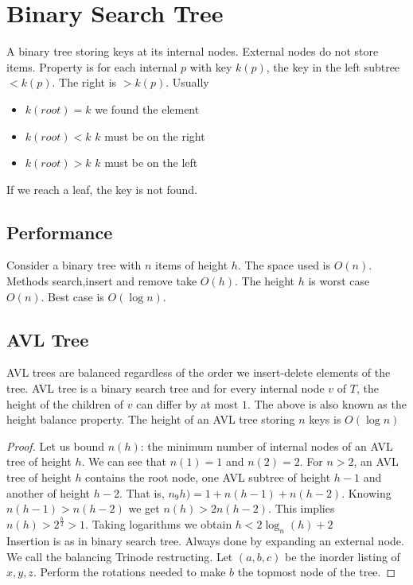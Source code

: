 \documentclass[a4paper]{article}
\theoremstyle{plain}
\theoremstyle{definition}
\theoremstyle{remark}
\begin{document}
\section{Binary Search Tree}
A binary tree storing keys at its internal nodes. External nodes do not store items. Property is for each internal $p$ with key $k(p)$, the key in the left subtree $<k(p)$. The right is $>k(p)$. Usually
\begin{itemize}
	\item $k(root) = k$ we found the element
	\item $k(root) < k$ $k$ must be on the right
	\item $k(root) > k$ $k$ must be on the left
\end{itemize}
If we reach a leaf, the key is not found. 
\subsection{Performance}
Consider a binary tree with $n$ items of height $h$. The space used is $O(n)$. Methods search,insert and remove take $O(h)$. The height $h$ is worst case $O(n)$. Best case is $O(\log n)$. 
\subsection{AVL Tree}
AVL trees are balanced regardless of the order we insert-delete elements of the tree. AVL tree is a binary search tree and for every internal node $v$ of $T$, the height of the children of $v$ can differ by at most $1$. The above is also known as the height balance property. The height of an  AVL tree storing $n$ keys is $O(\log n)$
\begin{proof}
	Let us bound $n(h)$: the minimum number of internal nodes of an AVL tree of height $h$. We can see that $n(1) = 1$ and $n(2) = 2$. For $n > 2$, an AVL tree of height $h$ contains the root node, one AVL subtree of height $h-1 $ and another of height $h-2$. That is, $n_9h) = 1 +n(h-1) + n (h-2)$. Knowing $n(h-1) > n(h-2)$ we get $n(h) > 2n(h-2)$. This implies $n(h) > 2^{\frac{h}{2}}>1$. Taking logarithms we obtain $h < 2 \log_n (h) + 2$ \\
	Insertion is as in binary search tree. Always done by expanding an external node. We call the balancing Trinode restructing. Let $(a,b,c)$ be the inorder listing of $x,y,z$. Perform the rotations needed to make $b$ the topmost node of the tree. 
\end{proof}
\end{document}
